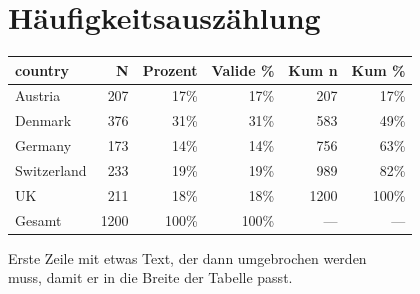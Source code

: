 \documentclass[
  a4paper,
  DIV=11,
  numbers=noendperiod]{scrartcl}
\begin{document}
\section{Häufigkeitsauszählung}\label{huxe4ufigkeitsauszuxe4hlung}

\begin{table}
\fontsize{12.0pt}{14.4pt}\selectfont
\begin{tabular*}{0.8\linewidth}{@{\extracolsep{\fill}}lrrrrr}
\toprule
country & N & Prozent & Valide \% & Kum n & Kum \% \\ 
\midrule\addlinespace[2.5pt]
Austria & 207 & 17\% & 17\% & 207 & 17\% \\ 
Denmark & 376 & 31\% & 31\% & 583 & 49\% \\ 
Germany & 173 & 14\% & 14\% & 756 & 63\% \\ 
Switzerland & 233 & 19\% & 19\% & 989 & 82\% \\ 
UK & 211 & 18\% & 18\% & 1200 & 100\% \\ 
{Gesamt} & {1200} & {100\%} & {100\%} & {—} & {—} \\ 
\bottomrule
\end{tabular*}
\begin{minipage}{\linewidth}
{Erste Zeile mit etwas Text, der dann umgebrochen werden}\\
{muss, damit er in die Breite der Tabelle passt.}\\
\end{minipage}
\end{table}
\end{document}
